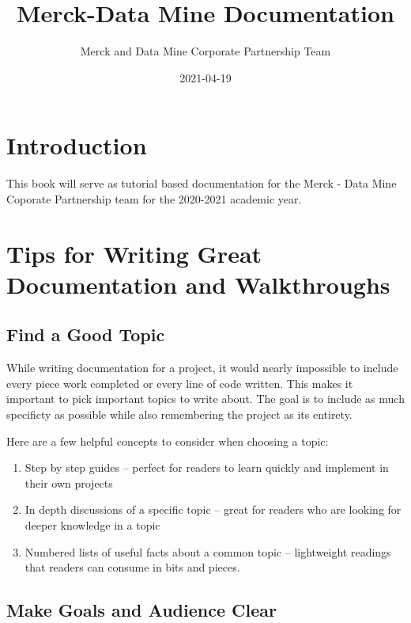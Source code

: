 \documentclass[]{book}
\title{Merck-Data Mine Documentation}
\author{Merck and Data Mine Corporate Partnership Team}
\date{2021-04-19}
\begin{document}
\maketitle

{
\setcounter{tocdepth}{1}
\tableofcontents
}
\chapter{Introduction}\label{introduction}

This book will serve as tutorial based documentation for the Merck -
Data Mine Coporate Partnership team for the 2020-2021 academic year.

\chapter{Tips for Writing Great Documentation and
Walkthroughs}\label{tips-for-writing-great-documentation-and-walkthroughs}

\section{Find a Good Topic}\label{find-a-good-topic}

While writing documentation for a project, it would nearly impossible to
include every piece work completed or every line of code written. This
makes it important to pick important topics to write about. The goal is
to include as much specificty as possible while also remembering the
project as its entirety.

Here are a few helpful concepts to consider when choosing a topic:

\begin{enumerate}
\def\labelenumi{\arabic{enumi}.}
\item
  Step by step guides -- perfect for readers to learn quickly and
  implement in their own projects
\item
  In depth discussions of a specific topic -- great for readers who are
  looking for deeper knowledge in a topic
\item
  Numbered lists of useful facts about a common topic -- lightweight
  readings that readers can consume in bits and pieces.
\end{enumerate}

\section{Make Goals and Audience
Clear}\label{make-goals-and-audience-clear}
\end{document}

